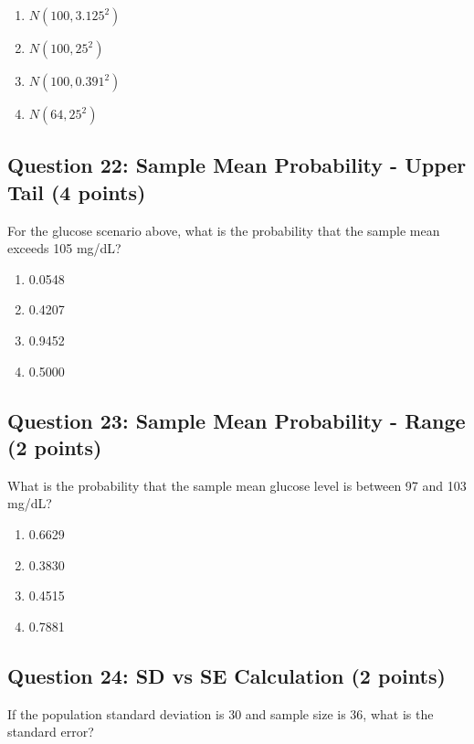 \documentclass[11pt]{article}
\begin{document}
\begin{enumerate}[label=\Alph*)]
\item $N(100, 3.125^2)$
\item $N(100, 25^2)$
\item $N(100, 0.391^2)$
\item $N(64, 25^2)$
\end{enumerate}

\vspace{0.5cm}

\subsection*{Question 22: Sample Mean Probability - Upper Tail (4 points)}

For the glucose scenario above, what is the probability that the sample mean exceeds 105 mg/dL?

\begin{enumerate}[label=\Alph*)]
\item 0.0548
\item 0.4207
\item 0.9452
\item 0.5000
\end{enumerate}

\vspace{0.5cm}

\subsection*{Question 23: Sample Mean Probability - Range (2 points)}

What is the probability that the sample mean glucose level is between 97 and 103 mg/dL?

\begin{enumerate}[label=\Alph*)]
\item 0.6629
\item 0.3830
\item 0.4515
\item 0.7881
\end{enumerate}

\vspace{0.5cm}

\subsection*{Question 24: SD vs SE Calculation (2 points)}

If the population standard deviation is 30 and sample size is 36, what is the standard error?
\end{document}
